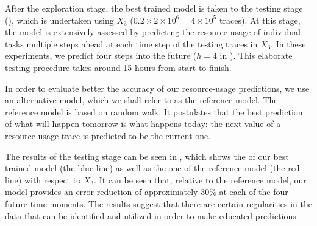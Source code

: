 After the exploration stage, the best trained model is taken to the testing
stage (), which is undertaken using $X_3$ ($0.2 \times 2 \times
10^6 = 4 \times 10^5$ traces). At this stage, the model is extensively assessed
by predicting the resource usage of individual tasks multiple steps ahead at
each time step of the testing traces in $X_3$. In these experiments, we predict
four steps into the future ($h = 4$ in ). This elaborate testing
procedure takes around 15 hours from start to finish.

In order to evaluate better the accuracy of our resource-usage predictions, we
use an alternative model, which we shall refer to as the reference model. The
reference model is based on random walk. It postulates that the best prediction
of what will happen tomorrow is what happens today: the next value of a
resource-usage trace is predicted to be the current one.

The results of the testing stage can be seen in , which shows the
 of our best trained model (the blue line) as well as the one of the
reference model (the red line) with respect to $X_3$. It can be seen that,
relative to the reference model, our model provides an error reduction of
approximately 30\% at each of the four future time moments. The results suggest
that there are certain regularities in the data that can be identified and
utilized in order to make educated predictions.
